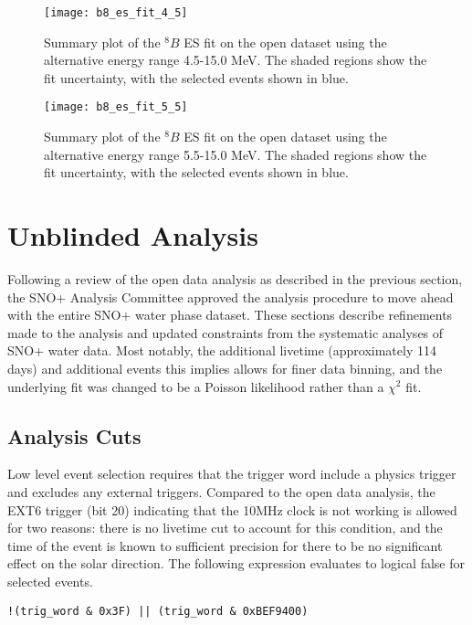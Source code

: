 \begin{figure}
\centering
\texttt{[image: b8\_es\_fit\_4\_5]}
\caption{
Summary plot of the $^8B$ ES fit on the open dataset using the alternative energy range 4.5-15.0 MeV.
The shaded regions show the fit uncertainty, with the selected events shown in blue.
}
\label{fig:solar:open45}
\end{figure}

\begin{figure}
\centering
\texttt{[image: b8\_es\_fit\_5\_5]}
\caption{
Summary plot of the $^8B$ ES fit on the open dataset using the alternative energy range 5.5-15.0 MeV.
The shaded regions show the fit uncertainty, with the selected events shown in blue.
}
\label{fig:solar:open55}
\end{figure}

\section{Unblinded Analysis}
\label{sec:solar:unblinded}

Following a review of the open data analysis as described in the previous section, the SNO+ Analysis Committee approved the analysis procedure to move ahead with the entire SNO+ water phase dataset.
These sections describe refinements made to the analysis and updated constraints from the systematic analyses of SNO+ water data.
Most notably, the additional livetime (approximately 114 days) and additional events this implies allows for finer data binning, and the underlying fit was changed to be a Poisson likelihood rather than a $\chi^2$ fit.

\subsection{Analysis Cuts}
\label{sec:solar:unblind_cuts}

Low level event selection requires that the trigger word include a physics
trigger and excludes any external triggers.
Compared to the open data analysis, the EXT6 trigger (bit 20) indicating 
that the 10MHz clock is not working is allowed for two reasons: there is no
livetime cut to account for this condition, and the time of the event is 
known to sufficient precision for there to be no significant effect on the 
solar direction.
The following expression evaluates to logical false for selected events.

\begin{verbatim}
!(trig_word & 0x3F) || (trig_word & 0xBEF9400)
\end{verbatim}

